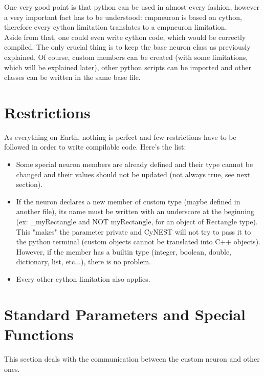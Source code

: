 \documentclass{article}
\begin{document}
One very good point is that python can be used in almost every fashion, however a very important fact has to be understood: cmpneuron is based on cython, therefore every cython limitation translates to a cmpneuron limitation. \\
Aside from that, one could even write cython code, which would be correctly compiled. The only crucial thing is to keep the base neuron class as previously explained. Of course, custom members can be created (with some limitations, which will be explained later), other python scripts can be imported and other classes can be written in the same base file.

\section{Restrictions}
As everything on Earth, nothing is perfect and few restrictions have to be followed in order to write compilable code. Here's the list:
\begin{itemize}
\item Some special neuron members are already defined and their type cannot be changed and their values should not be updated (not always true, see next section).
\item If the neuron declares a new member of custom type (maybe defined in another file), its name must be written with an underscore at the beginning (ex: \_myRectangle and NOT myRectangle, for an object of Rectangle type). This "makes" the parameter private and CyNEST will not try to pass it to the python terminal (custom objects cannot be translated into C++ objects). However, if the member has a builtin type (integer, boolean, double, dictionary, list, etc...), there is no problem.
\item Every other cython limitation also applies.
\end{itemize}

\section{Standard Parameters and Special Functions}
This section deals with the communication between the custom neuron and other ones.\\
\end{document}
